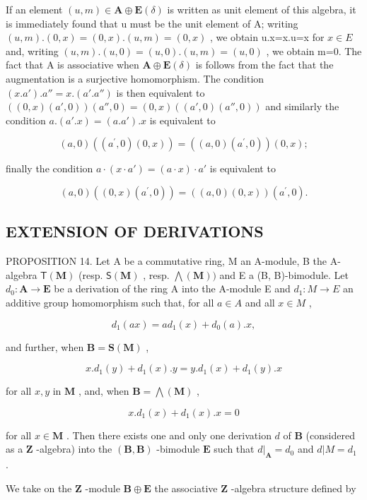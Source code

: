 If an element \((u,m)\in\mathbf{A}\oplus\mathbf{E}(\delta)\) is written as unit element of this algebra, it is immediately found that u must be the unit element of A; writing \((u,m).(0,x)=(0,x).(u,m)=(0,x)\) , we obtain u.x=x.u=x for \(x\in E\) and, writing \((u,m).(u,0)=(u,0).(u,m)=(u,0)\) , we obtain m=0. The fact that A is associative when \(\mathbf{A}\oplus\mathbf{E}(\delta)\) is follows from the fact that the augmentation is a surjective homomorphism. The condition \((x.a') .a''=x.(a'.a'')\) is then equivalent to \(((0,x)(a',0))(a'',0)=(0,x)((a',0)(a'',0))\) and similarly the condition \(a.(a'.x)=(a.a').x\) is equivalent to

\[
(a, 0) ((a ^ {\prime}, 0) (0, x)) = ((a, 0) (a ^ {\prime}, 0)) (0, x);
\]

finally the condition \(a \cdot (x \cdot a') = (a \cdot x) \cdot a'\) is equivalent to

\[
(a, 0) ((0, x) (a ^ {\prime}, 0)) = ((a, 0) (0, x)) (a ^ {\prime}, 0).
\]

\subsection{EXTENSION OF DERIVATIONS}

PROPOSITION 14. Let A be a commutative ring, M an A-module, B the A-algebra \(\mathsf{T}(\mathbf{M})\) (resp. \(\mathsf{S}(\mathbf{M})\) , resp. \(\bigwedge (\mathbf{M}))\) and E a (B, B)-bimodule. Let \(d_0: \mathbf{A} \to \mathbf{E}\) be a derivation of the ring A into the A-module E and \(d_{1}:M\to E\) an additive group homomorphism such that, for all \(a\in A\) and all \(x\in M\) ,

\[
d _ {1} (a x) = a d _ {1} (x) + d _ {0} (a). x,\tag{29}
\]

and further, when \(\mathbf{B} = \mathbf{S}(\mathbf{M})\) ,

\[
x. d _ {1} (y) + d _ {1} (x). y = y. d _ {1} (x) + d _ {1} (y). x\tag{30}
\]

for all \(x, y\) in \(\mathbf{M}\) , and, when \(\mathbf{B} = \bigwedge (\mathbf{M})\) ,

\[
x. d _ {1} (x) + d _ {1} (x). x = 0\tag{31}
\]

for all \(x \in \mathbf{M}\) . Then there exists one and only one derivation \(d\) of \(\mathbf{B}\) (considered as a \(\mathbf{Z}\) -algebra) into the \((\mathbf{B}, \mathbf{B})\) -bimodule \(\mathbf{E}\) such that \(d|_{\mathbf{A}} = d_0\) and \(d|M = d_1\) .

We take on the \(\mathbf{Z}\) -module \(\mathbf{B} \oplus \mathbf{E}\) the associative \(\mathbf{Z}\) -algebra structure defined by

